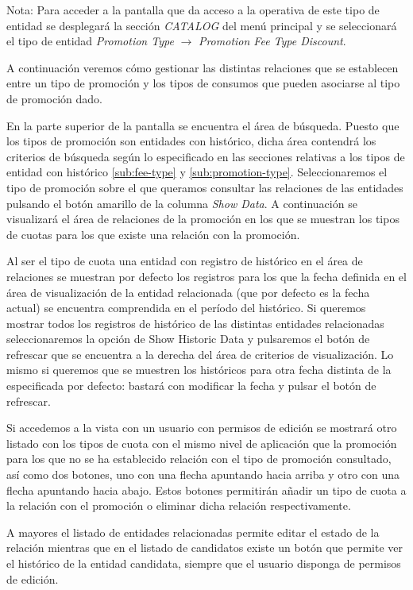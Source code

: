 Nota: Para acceder a la pantalla que da acceso a la operativa de este tipo de entidad se desplegará la sección \emph{CATALOG} del menú principal y se seleccionará el tipo de entidad \emph{Promotion Type} $\rightarrow$  \emph{Promotion Fee Type Discount}.


A continuación veremos cómo gestionar las distintas relaciones que se establecen entre un tipo de promoción y los tipos de consumos que pueden asociarse al tipo de promoción dado.


En la parte superior de la pantalla se encuentra el área de búsqueda. Puesto que los tipos de promoción son entidades con histórico, dicha área contendrá los criterios de búsqueda según lo especificado en las secciones relativas a los tipos de entidad con histórico \ref{sub:fee-type} y \ref{sub:promotion-type}. 
Seleccionaremos el tipo de promoción sobre el que queramos consultar las relaciones de las entidades pulsando el botón amarillo de la columna \emph{Show Data}. A continuación se visualizará el área de relaciones de la promoción en los que se muestran los tipos de cuotas para los que existe una relación con la promoción.


Al ser el tipo de cuota una entidad con registro de histórico en el área de relaciones se muestran por defecto los registros para los que la fecha definida en el área de visualización de la entidad relacionada (que por defecto es la fecha actual) se encuentra comprendida en el período del histórico. Si queremos mostrar todos los registros de histórico de las distintas entidades relacionadas seleccionaremos la opción de Show Historic Data y pulsaremos el botón de refrescar que se encuentra a la derecha del área de criterios de visualización. Lo mismo si queremos que se muestren los históricos para otra fecha distinta de la especificada por defecto: bastará con modificar la fecha y pulsar el botón de refrescar.

Si accedemos a la vista con un usuario con permisos de edición se mostrará otro listado con los tipos de cuota con el mismo nivel de aplicación que la promoción para los que no se ha establecido relación con el tipo de promoción consultado, así como dos botones, uno con una flecha apuntando hacia arriba y otro con una flecha apuntando hacia abajo. Estos botones permitirán añadir un tipo de cuota a la relación con el promoción o eliminar dicha relación respectivamente. 

A mayores el listado de entidades relacionadas permite editar el estado de la relación mientras que en el listado de candidatos existe un botón que permite ver el histórico de la entidad candidata, siempre que el usuario disponga de permisos de edición.


